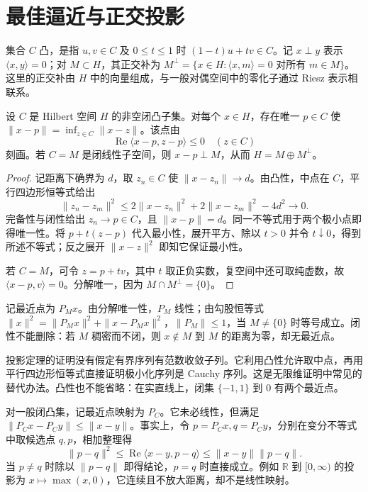 \documentclass[UTF8,12pt,a4paper,fontset=fandol]{ctexbook}
\begin{document}
\section{最佳逼近与正交投影}
集合 $C$ 凸，是指 $u,v\in C$ 及 $0\leq t\leq1$ 时 $(1-t)u+tv\in C$。记 $x\perp y$ 表示 $\langle x,y\rangle=0$；对 $M\subset H$，其正交补为 $M^\perp=\{x\in H:\langle x,m\rangle=0\text{ 对所有 }m\in M\}$。这里的正交补由 $H$ 中的向量组成，与一般对偶空间中的零化子通过 Riesz 表示相联系。
\begin{theorem}[投影定理]\label{thm:fa-projection}
设 $C$ 是 Hilbert 空间 $H$ 的非空闭凸子集。对每个 $x\in H$，存在唯一 $p\in C$ 使 $\|x-p\|=\inf_{z\in C}\|x-z\|$。该点由
\[
 \operatorname{Re}\langle x-p,z-p\rangle\leq0\quad(z\in C)
\]
刻画。若 $C=M$ 是闭线性子空间，则 $x-p\perp M$，从而 $H=M\oplus M^\perp$。
\end{theorem}
\begin{proof}
记距离下确界为 $d$，取 $z_n\in C$ 使 $\|x-z_n\|\to d$。由凸性，中点在 $C$，平行四边形恒等式给出
\[
 \|z_n-z_m\|^2\leq2\|x-z_n\|^2+2\|x-z_m\|^2-4d^2\to0.
\]
完备性与闭性给出 $z_n\to p\in C$，且 $\|x-p\|=d$。同一不等式用于两个极小点即得唯一性。将 $p+t(z-p)$ 代入最小性，展开平方、除以 $t>0$ 并令 $t\downarrow0$，得到所述不等式；反之展开 $\|x-z\|^2$ 即知它保证最小性。

若 $C=M$，可令 $z=p+tv$，其中 $t$ 取正负实数，复空间中还可取纯虚数，故 $\langle x-p,v\rangle=0$。分解唯一，因为 $M\cap M^\perp=\{0\}$。
\end{proof}
记最近点为 $P_Mx$。由分解唯一性，$P_M$ 线性；由勾股恒等式 $\|x\|^2=\|P_Mx\|^2+\|x-P_Mx\|^2$，$\|P_M\|\leq1$，当 $M\ne\{0\}$ 时等号成立。闭性不能删除：若 $M$ 稠密而不闭，则 $x\notin M$ 到 $M$ 的距离为零，却无最近点。

投影定理的证明没有假定有界序列有范数收敛子列。它利用凸性允许取中点，再用平行四边形恒等式直接证明极小化序列是 Cauchy 序列。这是无限维证明中常见的替代办法。凸性也不能省略：在实直线上，闭集 $\{-1,1\}$ 到 $0$ 有两个最近点。

对一般闭凸集，记最近点映射为 $P_C$。它未必线性，但满足 $\|P_Cx-P_Cy\|\leq\|x-y\|$。事实上，令 $p=P_Cx,q=P_Cy$，分别在变分不等式中取候选点 $q,p$，相加整理得
\[
 \|p-q\|^2\leq\operatorname{Re}\langle x-y,p-q\rangle
 \leq\|x-y\|\|p-q\|.
\]
当 $p\ne q$ 时除以 $\|p-q\|$ 即得结论，$p=q$ 时直接成立。例如 $\mathbb R$ 到 $[0,\infty)$ 的投影为 $x\mapsto\max(x,0)$，它连续且不放大距离，却不是线性映射。
\end{document}
